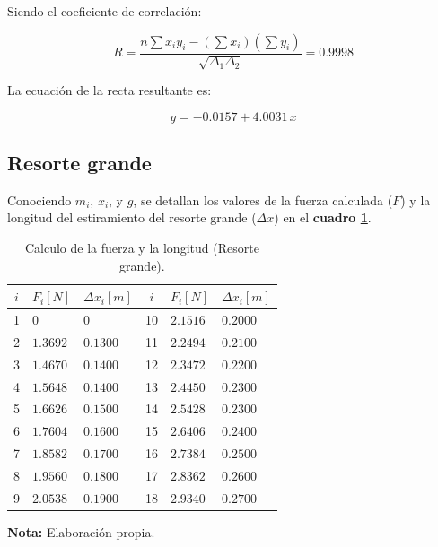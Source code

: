 \documentclass[letter,11pt]{article}
\newcommand{\source}[1]{\vspace{-11pt} \caption*{\small{\textbf{Nota:} {#1}}}}
\begin{document}
Siendo el coeficiente de correlación:

\begin{equation*}
    R = \frac{n \sum x_i y_i - (\sum x_i)(\sum y_i)}{\sqrt{\Delta_1 \Delta_2}}
      = 0.9998
\end{equation*}
\vspace{0.10cm}

La ecuación de la recta resultante es:

\begin{equation*}
    y = -0.0157 + 4.0031\,x
\end{equation*}
\vspace{0.10cm}

\subsection{Resorte grande}

Conociendo $m_i$, $x_i$, y $g$, se detallan los valores de la fuerza calculada
($F$) y la longitud del estiramiento del resorte grande ($\Delta x$) en el
\textbf{cuadro \ref{cuadro5}}.

\begin{table}[!h]
\begin{center}
\begin{tabular}{|c||>{\centering}m{2.0cm}<{\centering}
                  |>{\centering}m{2.0cm}<{\centering}|
                |c||>{\centering}m{2.0cm}<{\centering}
                  |>{\centering}m{2.0cm}<{\centering}|}
\hline
$i$ & $F_i [N]$ & $\Delta x_i [m]$ & $i$ & $F_i [N]$ & $\Delta x_i [m]$
    \tabularnewline \hline \hline
 1 & $     0$ & $     0$ & 10 & $2.1516$ & $0.2000$\tabularnewline \hline
 2 & $1.3692$ & $0.1300$ & 11 & $2.2494$ & $0.2100$\tabularnewline \hline
 3 & $1.4670$ & $0.1400$ & 12 & $2.3472$ & $0.2200$\tabularnewline \hline
 4 & $1.5648$ & $0.1400$ & 13 & $2.4450$ & $0.2300$\tabularnewline \hline
 5 & $1.6626$ & $0.1500$ & 14 & $2.5428$ & $0.2300$\tabularnewline \hline
 6 & $1.7604$ & $0.1600$ & 15 & $2.6406$ & $0.2400$\tabularnewline \hline
 7 & $1.8582$ & $0.1700$ & 16 & $2.7384$ & $0.2500$\tabularnewline \hline
 8 & $1.9560$ & $0.1800$ & 17 & $2.8362$ & $0.2600$\tabularnewline \hline
 9 & $2.0538$ & $0.1900$ & 18 & $2.9340$ & $0.2700$\tabularnewline \hline
\end{tabular}
\caption{Calculo de la fuerza y la longitud (Resorte grande).}
\label{cuadro5}
\source{Elaboración propia.}
\end{center}
\end{table}
\end{document}
